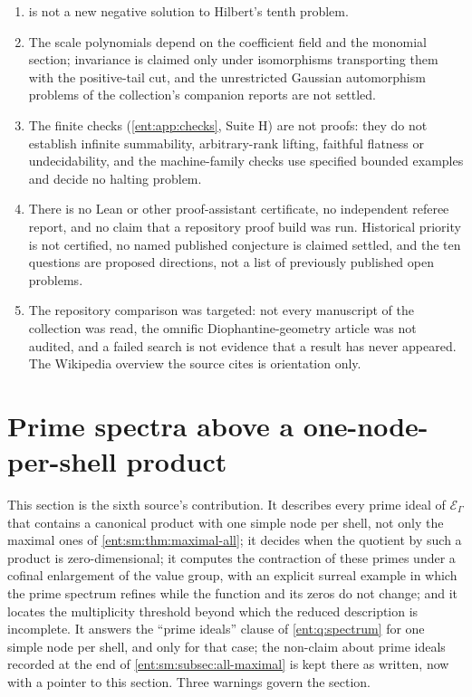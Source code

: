 \documentclass[11pt]{article}
\theoremstyle{plain}
\theoremstyle{plain}
\theoremstyle{plain}
\theoremstyle{definition}
\theoremstyle{definition}
\theoremstyle{definition}
\theoremstyle{definition}
\theoremstyle{remark}
\newcommand{\K}{K_\Gamma}\newcommand{\KD}{K_\Delta}
\newcommand{\E}{\mathcal E_\Gamma}
\newcommand{\kk}{\mathbf k}\newcommand{\PP}{\mathbb P}
\newcommand{\Oz}{\mathbf{Oz}}\newcommand{\Ed}{\mathcal E_{\Gamma,d}}
\newcounter{entassaveeq}
\newcommand{\Zk}{\Z_{\kk}}\newcommand{\OzK}{\Oz_{\K}}
\begin{document}
\begin{enumerate}[label=(\arabic*),leftmargin=2em]
or finite-expression classes are not ruled out, and the integer conditions
$\pg_0(\mathbf s)\in\Zk$ in arbitrary dimension are not decided.
\item {} is not a new negative solution to
Hilbert's tenth problem.
\item The scale polynomials depend on the coefficient field and the monomial
section; invariance is claimed only under isomorphisms transporting them with
the positive-tail cut, and the unrestricted Gaussian automorphism problems of
the collection's companion reports are not settled.
\item The finite checks (\cref{ent:app:checks}, Suite H) are not proofs: they
do not establish infinite summability, arbitrary-rank lifting, faithful
flatness or undecidability, and the machine-family checks use specified
bounded examples and decide no halting problem.
\item There is no Lean or other proof-assistant certificate, no independent
referee report, and no claim that a repository proof build was run.
Historical priority is not certified, no named published conjecture is claimed
settled, and the ten questions are proposed directions, not a list of
previously published open problems.
\item The repository comparison was targeted: not every manuscript of the
collection was read, the omnific Diophantine-geometry article was not audited,
and a failed search is not evidence that a result has never appeared. The
Wikipedia overview the source cites \cite{WikiSurreal} is orientation only.
\end{enumerate}

\setcounter{equation}{\value{entassaveeq}}%
\endgroup

\section{Prime spectra above a one-node-per-shell product}
\label{ent:ps:sec:spectrum}

This section is the sixth source's contribution. It describes every prime
ideal of $\E$ that contains a canonical product with one simple node per
shell, not only the maximal ones of \cref{ent:sm:thm:maximal-all}; it decides
when the quotient by such a product is zero-dimensional; it computes the
contraction of these primes under a cofinal enlargement of the value group,
with an explicit surreal example in which the prime spectrum refines while
the function and its zeros do not change; and it locates the multiplicity
threshold beyond which the reduced description is incomplete. It answers the
``prime ideals'' clause of \cref{ent:q:spectrum} for one simple node per
shell, and only for that case; the non-claim about prime ideals recorded at
the end of \cref{ent:sm:subsec:all-maximal} is kept there as written, now
with a pointer to this section. Three warnings govern the section.
\end{document}
